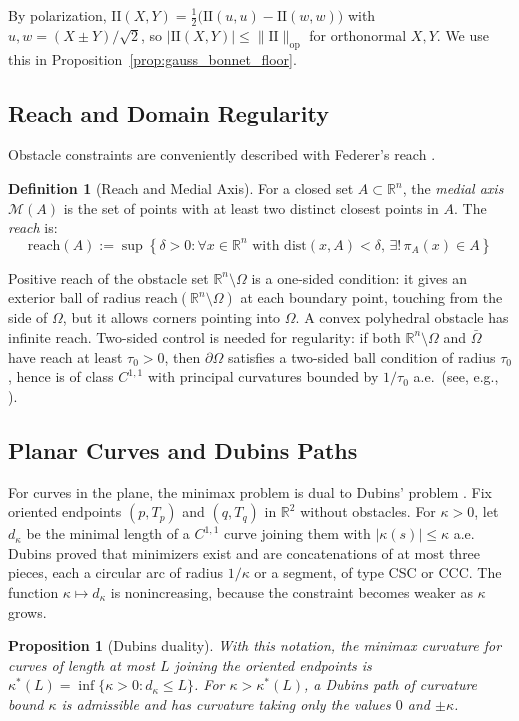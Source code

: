 \documentclass[11pt,reqno]{amsart}
\newtheorem{proposition}[theorem]{Proposition}
\theoremstyle{definition}
\newtheorem{definition}[theorem]{Definition}
\providecommand{\R}{\mathbb{R}}
\providecommand{\II}{\mathrm{I\!I}}
\newcommand{\op}{\mathrm{op}}
\newcommand{\dist}{\mathrm{dist}}
\newcommand{\reach}{\mathrm{reach}}
\newcommand{\medial}{\mathcal{M}}
\numberwithin{equation}{section}
\providecommand{\II}{\mathrm{II}}
\providecommand{\R}{\mathbb{R}}
\begin{document}
By polarization, $\II(X,Y) = \frac12\big(\II(u,u) - \II(w,w)\big)$ with $u, w = (X \pm Y)/\sqrt2$, so $|\II(X,Y)| \le \|\II\|_{\op}$ for orthonormal $X, Y$. We use this in Proposition~\ref{prop:gauss_bonnet_floor}.

\subsection{Reach and Domain Regularity}
Obstacle constraints are conveniently described with Federer's reach \cite{federer1959}.
\begin{definition}[Reach and Medial Axis]
For a closed set $A \subset \R^n$, the \emph{medial axis} $\medial(A)$ is the set of points with at least two distinct closest points in $A$. The \emph{reach} is:
\begin{equation}
\reach(A) := \sup \left\{ \delta > 0 : \forall x \in \R^n \text{ with } \dist(x, A) < \delta, \, \exists ! \, \pi_A(x) \in A \right\}
\end{equation}
\end{definition}
Positive reach of the obstacle set $\R^n \setminus \Omega$ is a one-sided condition: it gives an exterior ball of radius $\reach(\R^n\setminus\Omega)$ at each boundary point, touching from the side of $\Omega$, but it allows corners pointing into $\Omega$. A convex polyhedral obstacle has infinite reach. Two-sided control is needed for regularity: if both $\R^n\setminus\Omega$ and $\bar\Omega$ have reach at least $\tau_0 > 0$, then $\partial\Omega$ satisfies a two-sided ball condition of radius $\tau_0$, hence is of class $C^{1,1}$ with principal curvatures bounded by $1/\tau_0$ a.e.\ (see, e.g., \cite{lewicka2020}).

\subsection{Planar Curves and Dubins Paths}
For curves in the plane, the minimax problem is dual to Dubins' problem \cite{dubins1957}. Fix oriented endpoints $(p, T_p)$ and $(q, T_q)$ in $\R^2$ without obstacles. For $\kappa > 0$, let $d_\kappa$ be the minimal length of a $C^{1,1}$ curve joining them with $|\kappa(s)| \le \kappa$ a.e. Dubins proved that minimizers exist and are concatenations of at most three pieces, each a circular arc of radius $1/\kappa$ or a segment, of type CSC or CCC. The function $\kappa \mapsto d_\kappa$ is nonincreasing, because the constraint becomes weaker as $\kappa$ grows.

\begin{proposition}[Dubins duality]
\label{prop:dubins_duality}
With this notation, the minimax curvature for curves of length at most $L$ joining the oriented endpoints is $\kappa^*(L) = \inf\{\kappa > 0 : d_\kappa \le L\}$. For $\kappa > \kappa^*(L)$, a Dubins path of curvature bound $\kappa$ is admissible and has curvature taking only the values $0$ and $\pm\kappa$.
\end{proposition}
\end{document}
